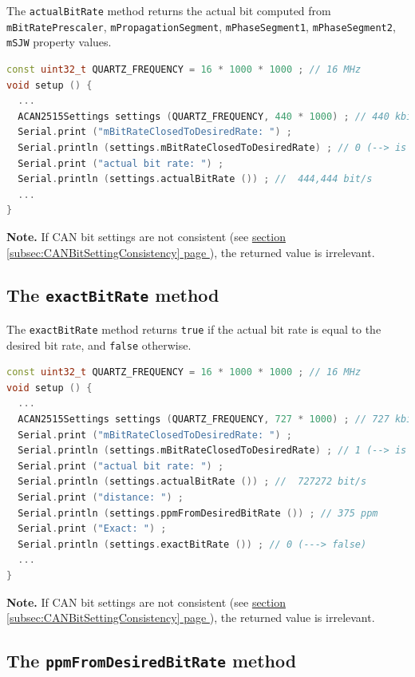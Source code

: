 \documentclass[10pt, a4paper, obeyspaces, openany]{extarticle}
\newcommand \subsectionLabel[2]{\subsection{#1}\label{subsec:#2}}
\newcommand\refSubsectionPage[1]{\hyperref[subsec:#1]{section \ref*{subsec:#1} page \pageref{subsec:#1}}}
\begin{document}
The \texttt{actualBitRate} method returns the actual bit computed from \texttt{mBitRatePrescaler}, \texttt{mPropagationSegment}, \texttt{mPhaseSegment1}, \texttt{mPhaseSegment2}, \texttt{mSJW} property values.

{ \small\begin{lstlisting}[language=c++]
const uint32_t QUARTZ_FREQUENCY = 16 * 1000 * 1000 ; // 16 MHz
void setup () {
  ...
  ACAN2515Settings settings (QUARTZ_FREQUENCY, 440 * 1000) ; // 440 kbit/s 
  Serial.print ("mBitRateClosedToDesiredRate: ") ;
  Serial.println (settings.mBitRateClosedToDesiredRate) ; // 0 (--> is false)
  Serial.print ("actual bit rate: ") ;
  Serial.println (settings.actualBitRate ()) ; //  444,444 bit/s
  ...
}
\end{lstlisting}}

{\bf Note. } If CAN bit settings are not consistent (see \refSubsectionPage{CANBitSettingConsistency}), the returned value is irrelevant.











\subsectionLabel{The \texttt{exactBitRate} method}{exactBitRate}


The \texttt{exactBitRate} method returns \texttt{true} if the actual bit rate is equal to the desired bit rate, and \texttt{false} otherwise.

{ \small\begin{lstlisting}[language=c++]
const uint32_t QUARTZ_FREQUENCY = 16 * 1000 * 1000 ; // 16 MHz
void setup () {
  ...
  ACAN2515Settings settings (QUARTZ_FREQUENCY, 727 * 1000) ; // 727 kbit/s
  Serial.print ("mBitRateClosedToDesiredRate: ") ;
  Serial.println (settings.mBitRateClosedToDesiredRate) ; // 1 (--> is true)
  Serial.print ("actual bit rate: ") ;
  Serial.println (settings.actualBitRate ()) ; //  727272 bit/s
  Serial.print ("distance: ") ;
  Serial.println (settings.ppmFromDesiredBitRate ()) ; // 375 ppm
  Serial.print ("Exact: ") ;
  Serial.println (settings.exactBitRate ()) ; // 0 (---> false)
  ...
}
\end{lstlisting}}

{\bf Note. } If CAN bit settings are not consistent (see \refSubsectionPage{CANBitSettingConsistency}), the returned value is irrelevant.






\subsectionLabel{The \texttt{ppmFromDesiredBitRate} method}{ppmFromDesiredBitRate}
\end{document}
